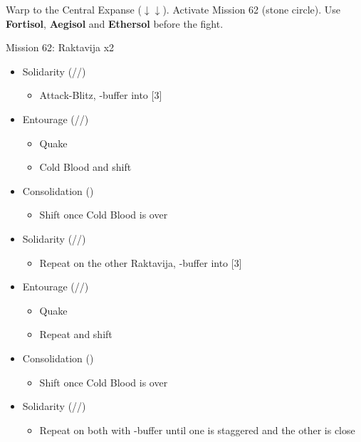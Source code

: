\renewcommand{\first}{[1] Ruthless (\com/\rav/\sab)}
\renewcommand{\second}{[2] Diversity (\com/\rav/\med)}
\renewcommand{\third}{[3] Solidarity (\com/\sen/\med)}
\renewcommand{\fourth}{[4] Protection (\syn/\sen/\med)}
\renewcommand{\fifth}{[5] Entourage (\rav/\sen/\med)}
\renewcommand{\sixth}{[6] Consolidation (\sen\sen\med)}

Warp to the Central Expanse ($\downarrow\downarrow$).
Activate Mission 62 (stone circle).
Use \textbf{Fortisol}, \textbf{Aegisol} and \textbf{Ethersol} before the fight.

\begin{battle}{Mission 62: Raktavija x2}
	\begin{itemize}
		\item \third
			\begin{itemize}
				\item Attack-Blitz, \rav-buffer into [3]
			\end{itemize}
		\item \fifth
			\begin{itemize}
				\item Quake
				\item Cold Blood and shift
			\end{itemize}
		\item \sixth
			\begin{itemize}
				\item Shift once Cold Blood is over
			\end{itemize}
		\item \third
			\begin{itemize}
				\item Repeat on the other Raktavija, \rav-buffer into [3]
			\end{itemize}
		\item \fifth
			\begin{itemize}
				\item Quake
				\item Repeat and shift
			\end{itemize}
		\item \sixth
			\begin{itemize}
				\item Shift once Cold Blood is over
			\end{itemize}
		\item \third
			\begin{itemize}
				\item Repeat on both with \rav-buffer until one is staggered and the other is close
					\begin{itemize}

\end{itemize}
\end{itemize}
\end{itemize}
\end{battle}
